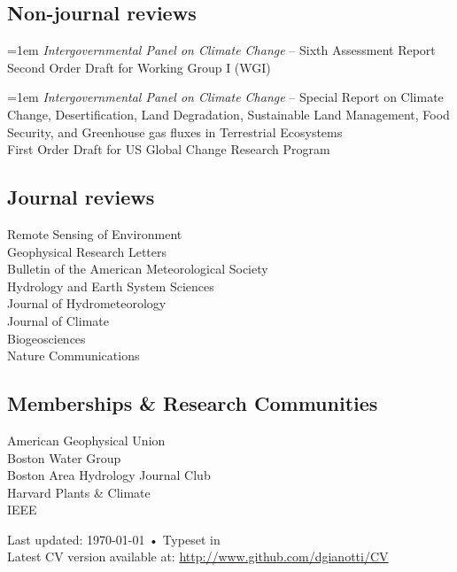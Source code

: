 \documentclass[10pt, a4paper]{article}
\renewcommand{\emph}[1]{\textit{#1}}
\newcommand{\years}[1]{\mbox{}\marginnote{\scriptsize #1}} %
\begin{document}
\subsection*{Non-journal reviews}
\years{2020}\hangindent=1em \emph{Intergovernmental Panel on Climate Change} -- Sixth Assessment Report \\
Second Order Draft for Working Group I (WGI)
		
\years{2018} \hangindent=1em \emph{Intergovernmental Panel on Climate Change} -- Special Report on Climate Change, Desertification, Land Degradation, Sustainable Land Management, Food Security, and Greenhouse gas fluxes in Terrestrial Ecosystems \\
First Order Draft for US Global Change Research Program

\subsection*{Journal reviews}
Remote Sensing of Environment\\
Geophysical Research Letters\\
Bulletin of the American Meteorological Society\\
Hydrology and Earth System Sciences\\
Journal of Hydrometeorology\\
Journal of Climate\\
Biogeosciences\\
Nature Communications

\subsection*{Memberships \& Research Communities}
American Geophysical Union\\ %
Boston Water Group\\ %
Boston Area Hydrology Journal Club\\ %
Harvard Plants \& Climate\\
IEEE


\vfill{}

\begin{center}
{\scriptsize  Last updated: \today\- •\- 
Typeset in \href{http://nitens.org/taraborelli/cvtex}{
\XeTeX }\\
Latest CV version available at: \href{http://www.github.com/dgianotti/CV}{http://www.github.com/dgianotti/CV}}
\end{center}
\end{document}

